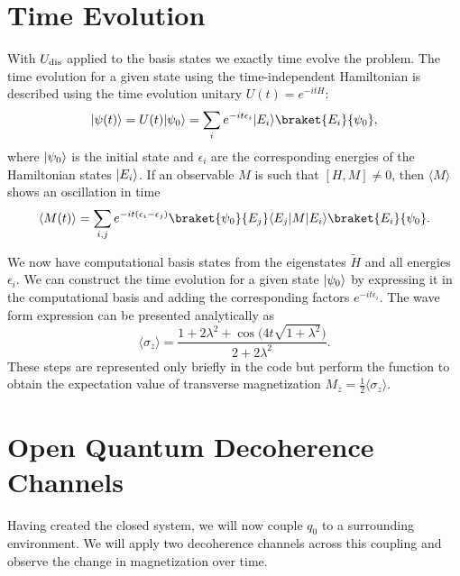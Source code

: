 \documentclass[12pt, twocolumn]{article}
\newcommand*{\eu}{e}
\newcommand*{\iu}{i}
\DeclarePairedDelimiter{\bra}{\langle}{\rvert}
\DeclarePairedDelimiter{\ket}{\lvert}{\rangle}
\begin{document}
  \section{Time Evolution}
  With \( U_{\textnormal{dis}} \) applied to the basis states we exactly time evolve the problem. The time evolution for a given state using the time-independent Hamiltonian is described using the time evolution unitary \( U(t) = \eu^{-\iu t H} \):
  \begin{equation}
    \ket{\psi(t)}
      = U(t) \ket{\psi_{0}}
      = \sum_{i} \eu^{-\iu t \epsilon_{i}} \ket{E_{i}} \braket{E_{i}}{\psi_{0}},
  \end{equation}
  where \( \ket{\psi_{0}} \) is the initial state and \( \epsilon_{i} \) are the corresponding energies of the Hamiltonian states \( \ket{E_{i}} \). If an observable \( M \) is such that \( [H, M] \neq 0 \), then \( \langle M \rangle \) shows an oscillation in time
  \begin{equation}
    \langle M(t) \rangle
      = \sum_{i, j} \eu^{-\iu t (\epsilon_{i} - \epsilon_{j})}
        \braket{\psi_{0}}{E_{j}} \bra{E_{j}} M \ket{E_{i}}
        \braket{E_{i}}{\psi_{0}}.
  \end{equation}

  We now have computational basis states from the eigenstates \( \tilde{H} \) and all energies \( \epsilon_{i} \). We can construct the time evolution for a given state \( \ket{\psi_{0}} \) by expressing it in the computational basis and adding the corresponding factors \( \eu^{-\iu t \epsilon_{i}} \). The wave form expression can be presented analytically as
  \begin{equation}
    \langle \sigma_{z} \rangle
      = \frac{1 + 2 \lambda^{2} + \cos \bigl( 4 t \sqrt{1 + \lambda^{2}} \bigr)}
             {2 + 2 \lambda^{2}}.
  \end{equation}
  These steps are represented only briefly in the code but perform the function to obtain the expectation value of transverse magnetization \( M_{z} = \frac{1}{2} \langle \sigma_{z} \rangle \).

  \section{Open Quantum Decoherence Channels}
  Having created the closed system, we will now couple $q_{0}$ to a surrounding environment. We will apply two decoherence channels across this coupling and observe the change in magnetization over time.
\end{document}
